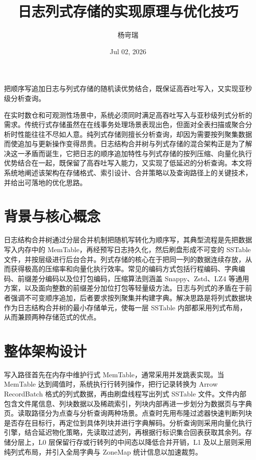 \title{日志列式存储的实现原理与优化技巧}
\author{杨岢瑞}
\date{Jul 02, 2026}
\maketitle
把顺序写追加日志与列式存储的随机读优势结合，既保证高吞吐写入，又实现亚秒级分析查询。\par
在实时数仓和可观测性场景中，系统必须同时满足高吞吐写入与亚秒级列式分析的需求。传统行式存储虽然在在线事务处理场景表现出色，但面对全表扫描或聚合分析时性能往往不尽如人意。纯列式存储则擅长分析查询，却因为需要按列聚集数据而使追加与更新操作变得昂贵。日志结构合并树与列式存储的混合架构正是为了解决这一矛盾而诞生，它把日志的顺序追加特性与列式存储的按列压缩、向量化执行优势结合在一起，既保留了高吞吐写入能力，又实现了低延迟的分析查询。本文将系统地阐述该架构在存储格式、索引设计、合并策略以及查询路径上的关键技术，并给出可落地的优化思路。\par
\chapter{背景与核心概念}
日志结构合并树通过分层合并机制把随机写转化为顺序写，其典型流程是先把数据写入内存中的 MemTable，再经预写日志持久化，然后刷盘形成不可变的 SSTable 文件，并按层级进行后台合并。列式存储的核心在于把同一列的数据连续存放，从而获得极高的压缩率和向量化执行效率。常见的编码方式包括行程编码、字典编码、前缀差分编码以及位打包编码，压缩算法则涵盖 Snappy、Zstd、LZ4 等通用方案，以及面向整数的前缀差分加位打包等轻量级方法。日志与列式的矛盾在于前者强调不可变顺序追加，后者要求按列聚集并构建字典。解决思路是将列式数据块作为日志结构合并树的最小存储单元，使每一层 SSTable 内部都采用列式布局，从而兼顾两种存储范式的优点。\par
\chapter{整体架构设计}
写入路径首先在内存中维护行式 MemTable，通常采用并发跳表实现。当 MemTable 达到阈值时，系统执行行转列操作，把行记录转换为 Arrow RecordBatch 格式的列式数据，再由刷盘线程写出列式 SSTable 文件。文件内部包含文件尾信息、列块数据以及稀疏索引，列块内部再进一步划分为数据页与字典页。读取路径分为点查与分析查询两种场景。点查时先用布隆过滤器快速判断列块是否存在目标行，再定位到具体列块并进行字典解码。分析查询则采用向量化执行引擎，结合延迟物化策略，先读取过滤列，再根据行标识集合回表获取其余列。存储分层上，L0 层保留行存或行转列的中间态以降低合并开销，L1 及以上层则采用纯列式布局，并引入全局字典与 ZoneMap 统计信息以加速裁剪。\par
